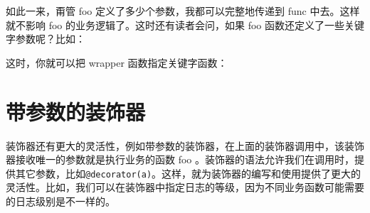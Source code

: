 \documentclass[]{ctexbook}
\newenvironment{Shaded}{\begin{snugshade}}{\end{snugshade}}
\newcommand{\BuiltInTok}[1]{#1}
\newcommand{\CommentTok}[1]{\textcolor[rgb]{0.56,0.35,0.01}{\textit{#1}}}
\newcommand{\ControlFlowTok}[1]{\textcolor[rgb]{0.13,0.29,0.53}{\textbf{#1}}}
\newcommand{\KeywordTok}[1]{\textcolor[rgb]{0.13,0.29,0.53}{\textbf{#1}}}
\newcommand{\NormalTok}[1]{#1}
\newcommand{\OperatorTok}[1]{\textcolor[rgb]{0.81,0.36,0.00}{\textbf{#1}}}
\newcommand{\SpecialCharTok}[1]{\textcolor[rgb]{0.00,0.00,0.00}{#1}}
\newcommand{\StringTok}[1]{\textcolor[rgb]{0.31,0.60,0.02}{#1}}
\newcommand{\VariableTok}[1]{\textcolor[rgb]{0.00,0.00,0.00}{#1}}
\begin{document}
如此一来，甭管 foo 定义了多少个参数，我都可以完整地传递到 func 中去。这样就不影响 foo 的业务逻辑了。这时还有读者会问，如果 foo 函数还定义了一些关键字参数呢？比如：

\begin{Shaded}
\end{Shaded}

这时，你就可以把 wrapper 函数指定关键字函数：

\begin{Shaded}
\end{Shaded}

\hypertarget{ux5e26ux53c2ux6570ux7684ux88c5ux9970ux5668}{%
\section{带参数的装饰器}\label{ux5e26ux53c2ux6570ux7684ux88c5ux9970ux5668}}

装饰器还有更大的灵活性，例如带参数的装饰器，在上面的装饰器调用中，该装饰器接收唯一的参数就是执行业务的函数 foo 。装饰器的语法允许我们在调用时，提供其它参数，比如\texttt{@decorator(a)}。这样，就为装饰器的编写和使用提供了更大的灵活性。比如，我们可以在装饰器中指定日志的等级，因为不同业务函数可能需要的日志级别是不一样的。
\end{document}
